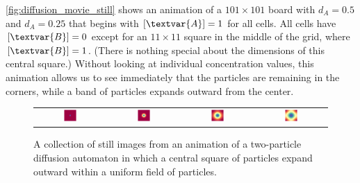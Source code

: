 \autoref{fig:diffusion_movie_still} shows an animation of a $101 \times 101$ board with $d_A = 0.5$ and $d_A = 0.25$ that begins with $[\textvar{A}] = 1$ for all cells. All cells have $[\textvar{B}] = 0$ except for an $11 \times 11$ square in the middle of the grid, where $[\textvar{B}] = 1$. (There is nothing special about the dimensions of this central square.) Without looking at individual concentration values, this animation allows us to see immediately that the  particles are remaining in the corners, while a band of  particles expands outward from the center.\\

\begin{note}\end{note}

\begin{figure}[h]
\centering
\mySfFamily
\begin{tabular}{c c c c}
\includegraphics[width = 0.19\textwidth]{../images/diffusion__Moment_1.png} & \includegraphics[width = 0.19\textwidth]{../images/diffusion__Moment_2.png} &
\includegraphics[width = 0.19\textwidth]{../images/diffusion__Moment_3.png} & \includegraphics[width = 0.19\textwidth]{../images/diffusion__Moment_4.png}
\end{tabular}
\caption{A collection of still images from an animation of a two-particle diffusion automaton in which a central square of  particles expand outward within a uniform field of  particles.}
\label{fig:diffusion_movie_still}
\end{figure}

